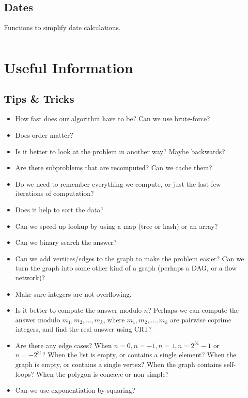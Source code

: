 \documentclass[9pt,a4paper]{amsart}
\newcommand{\code}[1]{\inputminted[linenos]{cpp}{_code/#1}}
\begin{document}
    \subsection{Dates}
        Functions to simplify date calculations.
        \code{other/dates.cpp}


\section{Useful Information}
    \subsection{Tips \&{} Tricks}
        \begin{itemize}
            \item How fast does our algorithm have to be? Can we use
                brute-force?
            \item Does order matter?
            \item Is it better to look at the problem in another way? Maybe
                backwards?
            \item Are there subproblems that are recomputed? Can we cache them?
            \item Do we need to remember everything we compute, or just the
                last few iterations of computation?
            \item Does it help to sort the data?
            \item Can we speed up lookup by using a map (tree or hash) or an
                array?
            \item Can we binary search the answer?
            \item Can we add vertices/edges to the graph to make the problem
                easier? Can we turn the graph into some other kind of a graph
                (perhaps a DAG, or a flow network)?
            \item Make sure integers are not overflowing.
            \item Is it better to compute the answer modulo $n$? Perhaps we can
                compute the answer modulo $m_1,m_2,\ldots,m_k$, where
                $m_1,m_2,\ldots,m_k$ are pairwise coprime integers, and find
                the real answer using CRT?
            \item Are there any edge cases? When $n=0, n=-1, n=1, n=2^{31}-1$
                or $n=-2^{31}$? When the list is empty, or contains a single
                element? When the graph is empty, or contains a single vertex?
                When the graph contains self-loops?  When the polygon is
                concave or non-simple?
            \item Can we use exponentiation by squaring?
        \end{itemize}
\end{document}
